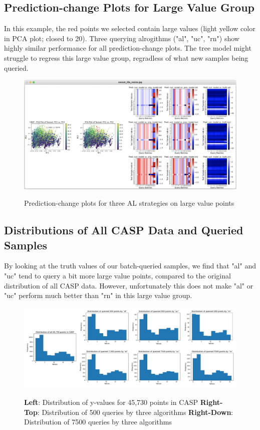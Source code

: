 \documentclass{article}
\begin{document}
\subsection{Prediction-change Plots for Large Value Group}


In this example, the red points we selected contain large values (light yellow color in PCA plot; closed to 20). Three querying alrogithms ("al", "uc", "rn") show highly similar performance for all prediction-change plots. The tree model might struggle to regress this large value group, regradless of what new samples being queried. 

\begin{figure}[h]

 \includegraphics[width=0.99\linewidth]{appendix_figure4.png}
 {
 }
 \caption{Prediction-change plots for three AL strategies on large value points}
 \centering
\label{fig4}
\end{figure}


\subsection{Distributions of All CASP Data and Queried Samples}

By looking at the truth values of our batch-queried samples, we find that "al" and "uc" tend to query a bit more large value points, compared to the original distribution of all CASP data. However, unfortunately this does not make "al" or "uc" perform much better than "rn" in this large value group.

\begin{figure}[h]

 \includegraphics[width=0.99\linewidth]{appendix_figure5.png}
 {
 }
 \caption{\textbf{Left}: Distribution of y-values for 45,730 points in CASP
          \textbf{Right-Top}: Distribution of 500 queries by three algorithms
          \textbf{Right-Down}: Distribution of 7500 queries by three algorithms
          }
 \centering
\label{fig5}
\end{figure}
\end{document}
